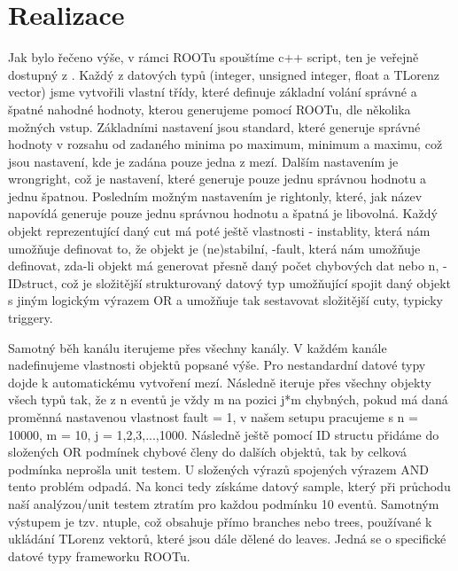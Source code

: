 \documentclass{article}
\begin{document}
\section*{Realizace}
\par Jak bylo řečeno výše, v rámci ROOTu spouštíme c++ script, ten je veřejně dostupný z \cite{code}. Každý z datových typů  (integer, unsigned integer, float a TLorenz vector) jsme vytvořili vlastní třídy, které definuje základní volání správné a špatné nahodné hodnoty, kterou generujeme pomocí ROOTu, dle několika možných vstup. Základními nastavení jsou standard, které generuje správné hodnoty v rozsahu od zadaného minima po maximum, minimum a maximu, což jsou nastavení, kde je zadána pouze jedna z mezí. Dalším nastavením je wrongright, což je nastavení, které generuje pouze jednu správnou hodnotu a jednu špatnou. Posledním možným nastavením je rightonly, které, jak název napovídá generuje pouze jednu správnou hodnotu a špatná je libovolná. Každý objekt reprezentující daný cut má poté ještě vlastnosti - instablity, která nám umožňuje definovat to, že objekt je (ne)stabilní, -fault, která nám umožňuje definovat, zda-li objekt má generovat přesně daný počet chybových dat nebo n, - IDstruct, což je složitější strukturovaný datový typ umožňující spojit daný objekt s jiným logickým výrazem OR a umožňuje tak sestavovat složitější cuty, typicky triggery.
\par Samotný běh kanálu iterujeme přes všechny kanály. V každém kanále nadefinujeme vlastnosti objektů popsané výše. Pro nestandardní datové typy dojde k automatickému vytvoření mezí. Následně iteruje přes všechny objekty všech typů tak, že z n eventů je vždy m na pozici j*m chybných, pokud má daná proměnná nastavenou vlastnost fault = 1, v našem setupu pracujeme s n = 10000, m = 10, j = {1,2,3,...,1000}. Následně ještě pomocí ID structu přidáme do složených OR podmínek chybové členy do dalších objektů, tak by celková podmínka neprošla unit testem. U složených výrazů spojených výrazem AND tento problém odpadá. Na konci tedy získáme datový sample, který při průchodu naší analýzou/unit testem ztratím pro každou podmínku 10 eventů. Samotným výstupem je tzv. ntuple, což obsahuje přímo branches nebo trees, používané k ukládání TLorenz vektorů, které jsou dále dělené do leaves. Jedná se o specifické datové typy frameworku ROOTu.
\end{document}
